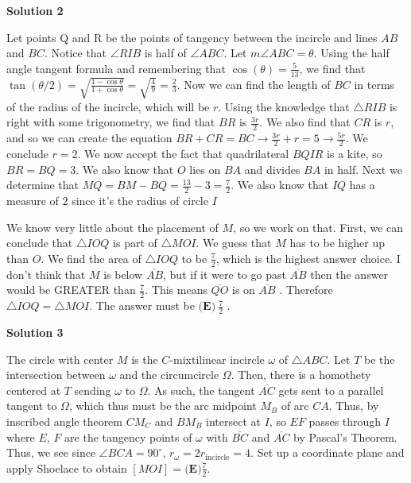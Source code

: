 \begin{enumerate}
 



\textbf{Solution 2}

Let points Q and R be the points of tangency between the incircle and lines $AB$ and $BC$.  Notice that $\angle RIB$ is half of $\angle ABC$. Let $m\angle ABC = \theta$. Using the half angle tangent formula and remembering that $\cos(\theta) = \frac{5}{13}$, we find that $\tan(\theta/2) = \sqrt{\frac{1-\cos\theta}{1+\cos\theta}} = \sqrt{\frac{4}{9}} = \frac{2}{3}$. Now we can find the length of $BC$ in terms of the radius of the incircle, which will be $r$.  Using the knowledge that $\triangle RIB$ is right with some trigonometry, we find that $BR$ is $\frac{3r}{2}$. We also find that $CR$ is $r$, and so we can create the equation $BR + CR = BC \to \frac{3r}{2} + r = 5 \to \frac{5r}{2}$. We conclude $r = 2$. We now accept the fact that quadrilateral $BQIR$ is a kite, so $BR = BQ = 3$.  We also know that $O$ lies on $BA$ and divides $BA$ in half.  Next we determine that $MQ = BM - BQ = \frac{13}{2} - 3 = \frac{7}{2}$. We also know that $IQ$ has a measure of $2$ since it's the radius of circle $I$ 

 We know very little about the placement of $M$, so we work on that.  First, we can conclude that $\triangle IOQ$ is part of $\triangle MOI$. We guess that $M$ has to be higher up than $O$. We find the area of $\triangle IOQ$ to be $\frac{7}{2}$, which is the highest answer choice. I don't think that $M$ is below $\overline{AB}$, but if it were to go past $\overline{AB}$ then the answer would be GREATER than $\frac{7}{2}$. This means $\overline{QO}$ is on $\overline{AB}$ . Therefore $\triangle IOQ=\triangle MOI$. The answer must be $\boxed{\textbf{(E)}\ \frac72}$ .

 



\textbf{Solution 3}

The circle with center $M$ is the $C$-mixtilinear incircle $\omega$ of $\triangle ABC$. Let $T$ be the intersection between $\omega$ and the circumcircle $\Omega$. Then, there is a homothety centered at $T$ sending $\omega$ to $\Omega$. As such, the tangent $\overline{AC}$ gets sent to a parallel tangent to $\Omega$, which thus must be the arc midpoint $M_B$ of arc ${CA}$. Thus, by inscribed angle theorem $CM_C$ and $BM_B$ intersect at $I$, so $EF$ passes through $I$ where $E$, $F$ are the tangency points of $\omega$ with $\overline{BC}$ and $\overline{AC}$ by Pascal's Theorem. Thus, we see since $\angle BCA = 90 ^{\circ}$, $r_{\omega} = 2 r_{\text{incircle}} = 4$. Set up a coordinate plane and apply Shoelace to obtain $[MOI] = \boxed{ \textbf{(E)} \frac{7}{2}}$.


\end{enumerate}
